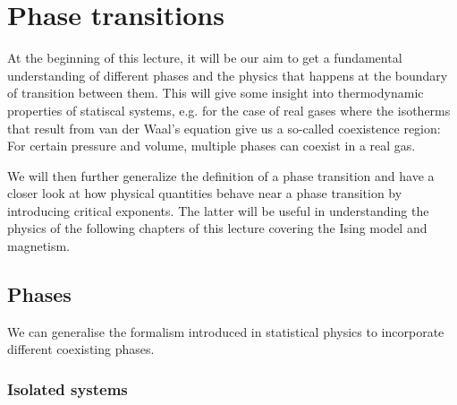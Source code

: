\chapter{Phase transitions}
\newcommand{\Nphases}{n_{p}}

At the beginning of this lecture, it will be our aim to get a fundamental understanding of different phases and the physics that happens at the boundary of transition between them. This will give some insight into thermodynamic properties of statiscal systems, e.g. for the case of real gases where the isotherms that result from van der Waal's equation give us a so-called coexistence region: For certain pressure and volume, multiple phases can coexist in a real gas. 

We will then further generalize the definition of a phase transition and have a closer look at how physical quantities behave near a phase transition by introducing critical exponents. The latter will be useful in understanding the physics of the following chapters of this lecture covering the Ising model and magnetism.

\section{Phases}

We can generalise  the formalism introduced in statistical physics to incorporate different coexisting phases.

\subsection{Isolated systems}

